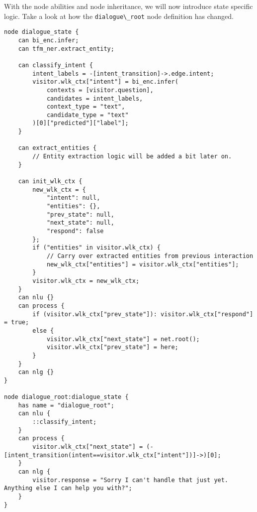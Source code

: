 With the node abilities and node inheritance, we will now introduce
state specific logic. Take a look at how the
\passthrough{\lstinline!dialogue\_root!} node definition has changed.

\begin{lstlisting}
node dialogue_state {
    can bi_enc.infer;
    can tfm_ner.extract_entity;

    can classify_intent {
        intent_labels = -[intent_transition]->.edge.intent;
        visitor.wlk_ctx["intent"] = bi_enc.infer(
            contexts = [visitor.question],
            candidates = intent_labels,
            context_type = "text",
            candidate_type = "text"
        )[0]["predicted"]["label"];
    }

    can extract_entities {
        // Entity extraction logic will be added a bit later on.
    }

    can init_wlk_ctx {
        new_wlk_ctx = {
            "intent": null,
            "entities": {},
            "prev_state": null,
            "next_state": null,
            "respond": false
        };
        if ("entities" in visitor.wlk_ctx) {
            // Carry over extracted entities from previous interaction
            new_wlk_ctx["entities"] = visitor.wlk_ctx["entities"];
        }
        visitor.wlk_ctx = new_wlk_ctx;
    }
    can nlu {}
    can process {
        if (visitor.wlk_ctx["prev_state"]): visitor.wlk_ctx["respond"] = true;
        else {
            visitor.wlk_ctx["next_state"] = net.root();
            visitor.wlk_ctx["prev_state"] = here;
        }
    }
    can nlg {}
}

node dialogue_root:dialogue_state {
    has name = "dialogue_root";
    can nlu {
        ::classify_intent;
    }
    can process {
        visitor.wlk_ctx["next_state"] = (-[intent_transition(intent==visitor.wlk_ctx["intent"])]->)[0];
    }
    can nlg {
        visitor.response = "Sorry I can't handle that just yet. Anything else I can help you with?";
    }
}
\end{lstlisting}

